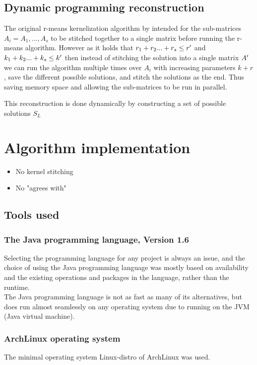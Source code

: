 \documentclass[a4paper]{article}
\begin{document}
\subsection{Dynamic programming reconstruction}
The original r-means kernelization algorithm by \cite{fomin_golovach_panolan_2020} 
intended for the sub-matrices $A_i=A_1,...,A_s$ to be stitched together to a single 
matrix before running the r-means algorithm. However as it holds that 
$r_1 + r_2 ... + r_s \leq r\sp{\prime}$ and $k_1 + k_2 ... + k_s \leq k\sp{\prime}$ 
then instead of stitching the solution into a single matrix $A\sp{\prime}$ 
we can run the algorithm multiple times over $A_i$ with increasing parameters $k+r$, 
save the different possible solutions, and stitch the solutions as the end. Thus saving 
memory space and allowing the sub-matrices to be run in parallel.

This reconstruction is done dynamically by constructing a set of possible solutions $S_L$



%
%
\newpage

\section{Algorithm implementation}
\begin{itemize}
    \item No kernel stitching
    \item No "agrees with"
\end{itemize}
\subsection{Tools used}
\subsubsection{The Java programming language, Version 1.6}
Selecting the programming language for any project is always an issue, and the choice of using
the Java programming language was mostly based on availability and the existing operations
and packages in the language, rather than the runtime.
\\
The Java programming language is not as fast as many of its alternatives, but does run almost
seamlessly on any operating system due to running on the JVM (Java virtual machine).

\subsubsection{ArchLinux operating system}
The minimal operating system Linux-distro of ArchLinux was used.
\end{document}
